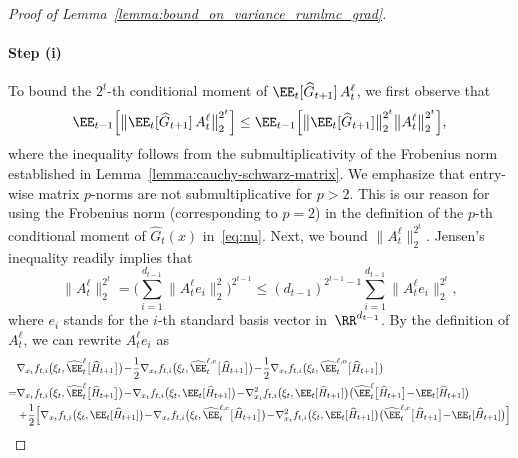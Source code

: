 \documentclass[11pt]{article}
\let\hat\widehat
\begin{document}
\begin{proof}[Proof of Lemma~\ref{lemma:bound_on_variance_rumlmc_grad}]
\paragraph{Step (i)} To bound the $2^t$-th conditional moment of $\EE_t[\hat{G}_{t+1}] \, A^\ell_t$, we first observe that
\begin{align}
    \label{eq:last-term}
    \EE_{t-1}\Big[\big\|\EE_t[\hat{G}_{t+1}] \, A^\ell_t\big\|_{2}^{2^t}\Big]
   \leq \EE_{t-1}\Big[\big\|\EE_t[\hat{G}_{t+1}] \big\|_{2}^{2^t} \big\| A^\ell_t\big\|_{2}^{2^t}\Big],
\end{align}
where the inequality follows from the submultiplicativity of the Frobenius norm established in Lemma~\ref{lemma:cauchy-schwarz-matrix}. We emphasize that entry-wise matrix $p$-norms are not submultiplicative for $p>2$. This is our reason for using the Frobenius norm (corresponding to $p=2$) in the definition of the $p$-th conditional moment of $\hat{G}_t(x)$ in~\eqref{eq:nu}. 
Next, we bound $\| A^\ell_t\|_{2}^{2^t}$. Jensen's inequality readily implies that
\begin{equation}
    \label{eq:A^ell_t-norm-bound}
    \| A^\ell_t\|_{2}^{2^t}= \bigg(\sum_{i=1}^{d_{t-1}} \big\| A^\ell_t  e_i \big\|_{2}^2 \bigg)^{2^{t-1}}\leq (d_{t-1})^{2^{t-1}-1}\sum_{i=1}^{d_{t-1}} \| A^\ell_t e_i\|_{2}^{2^{t}},
\end{equation}
where $e_i$ stands for the $i$-th standard basis vector in~$\RR^{d_{t-1}}$. By the definition of $A_t^\ell$, we can rewrite $A_t^\ell e_i$ as
\begin{align*}
   & \nabla_{x_t} f_{t,i} \big(\xi_t, \hat\EE_t^{\ell}\big[\hat{H}_{t+1}\big]\big) 
    \! - \! \frac{1}{2}\nabla_{x_t} f_{t,i} \big(\xi_t, \hat\EE_t^{\ell, {\rm e}}\big[\hat{H}_{t+1}\big]\big) 
    \! - \! \frac{1}{2}\nabla_{x_t} f_{t,i} \big(\xi_t, \hat\EE_t^{\ell, {\rm o}}\big[\hat{H}_{t+1}\big]\big)\\
    = & \nabla_{x_t} f_{t,i} \big(\xi_t, \hat\EE_t^{\ell}\big[\hat{H}_{t+1}\big]\big) \! - \! \nabla_{x_t} f_{t,i} \big(\xi_t, \EE_t[\hat{H}_{t+1}]\big) \! - \! \nabla^2_{x_t} f_{t,i} \big(\xi_t,\EE_t[\hat{H}_{t+1}]\big) \big(\hat\EE_t^{\ell}\big[\hat{H}_{t+1}\big]\! - \!\EE_t[\hat{H}_{t+1}]\big)\\
    &+ \! \frac{1}{2}\Big[\nabla_{x_t} f_{t,i} \big(\xi_t, \EE_t[\hat{H}_{t+1}]\big) 
    \! - \! \nabla_{x_t} f_{t,i} \big(\xi_t, \hat\EE_t^{\ell, {\rm e}}\big[\hat{H}_{t+1}\big]\big) \! - \! \nabla^2_{x_t} f_{t,i} \big(\xi_t,\EE_t[\hat{H}_{t+1}]\big) \big(\hat\EE_t^{\ell, {\rm e}}\big[\hat{H}_{t+1}\big]\! - \!\EE_t[\hat{H}_{t+1}]\big) \Big]\\

\end{align*}
\end{proof}
\end{document}
